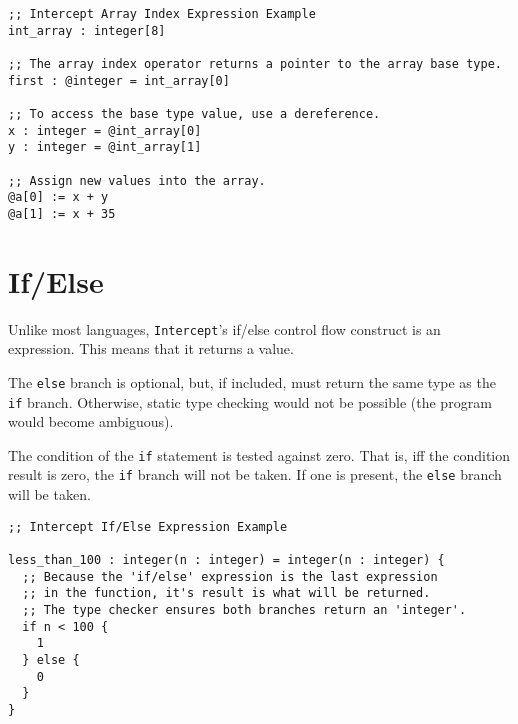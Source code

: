\documentclass[12pt]{report}
\begin{document}
\begin{Verbatim}[samepage=true]
;; Intercept Array Index Expression Example
int_array : integer[8]

;; The array index operator returns a pointer to the array base type.
first : @integer = int_array[0]

;; To access the base type value, use a dereference.
x : integer = @int_array[0]
y : integer = @int_array[1]

;; Assign new values into the array.
@a[0] := x + y
@a[1] := x + 35
\end{Verbatim}

\section{If/Else}
\label{subsec:expressions-if-else}

Unlike most languages, \verb|Intercept|'s if/else control flow construct is an expression. This means that it returns a value.

The \verb|else| branch is optional, but, if included, must return the same type as the \verb|if| branch. Otherwise, static type checking would not be possible (the program would become ambiguous).

The condition of the \verb|if| statement is tested against zero. That is, iff the condition result is zero, the \verb|if| branch will not be taken. If one is present, the \verb|else| branch will be taken.

\begin{Verbatim}[samepage=true]
;; Intercept If/Else Expression Example

less_than_100 : integer(n : integer) = integer(n : integer) {
  ;; Because the 'if/else' expression is the last expression
  ;; in the function, it's result is what will be returned.
  ;; The type checker ensures both branches return an 'integer'.
  if n < 100 {
    1
  } else {
    0
  }
}
\end{Verbatim}
\end{document}
